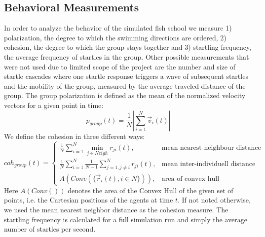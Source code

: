 	\subsection{Behavioral Measurements}
	In order to analyze the behavior of the simulated fish school we measure 1) polarization, the degree to which the swimming directions are ordered, 2) cohesion, the degree to which the group stays together and 3) startling frequency, the average frequency of startles in the group.
	Other possible measurements that were not used due to limited scope of the project are the number and size of startle cascades where one startle response triggers a wave of subsequent startles and the mobility of the group, measured by the average traveled distance of the group.
	The group polarization is defined as the mean of the normalized velocity vectors for a given point in time:
	\begin{equation}
		p_{group}(t) = \frac{1}{N} \left| \sum_{i=1}^{N} \vec{v}_i(t) \right|
		\label{eq:pol}
	\end{equation}
	We define the cohesion in three different ways:
	\begin{equation}
		coh_{group}(t) = \left\{\begin{array}{lc}
		\frac{1}{N} \sum\limits_{i=1}^{N} \min\limits_{j \in Neigh} r_{ji}(t) , & \text{mean nearest neighbour distance}\\[12pt]
		\frac{1}{N} \sum\limits_{i=1}^{N}\frac{1}{N-1} \sum\limits_{j=1, j\neq i}^{N} r_{ji}(t), & \text{mean inter-individuell distance}\\[12pt]
		A(Conv(\{\vec{r}_i(t), i \in N \})), & \text{area of convex hull}
		\end{array}\right.
		\label{eq:coh}
	\end{equation}
	Here $A(Conv())$ denotes the area of the Convex Hull of the given set of points, i.e. the Cartesian positions of the agents at time $t$.
	If not noted otherwise, we used the mean nearest neighbor distance as the cohesion measure.
	The startling frequency is calculated for a full simulation run and simply the average number of startles per second.
